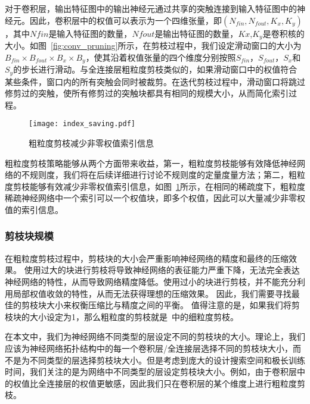 对于卷积层，输出特征图中的输出神经元通过共享的突触连接到输入特征图中的神经元。因此，卷积层中的权值可以表示为一个四维张量，即$(N_{fin},N_{fout},K_x,K_y)$，其中$N {fin}$是输入特征图的数量，$N {fout}$是输出特征图的数量，$K x$,$K_y$是卷积核的大小。如图~\ref{fig:conv_pruning}所示，在剪枝过程中，我们设定滑动窗口的大小为$B_{fin} \times B_{fout} \times B_x \times B_y$，使其沿着权值张量的四个维度分别按照$S_{fin}$，$S_{fout}$，$S_x$和$S_y$的步长进行滑动。与全连接层粗粒度剪枝类似的，如果滑动窗口中的权值符合某些条件，窗口内的所有突触会同时被裁剪。在迭代剪枝过程中，滑动窗口将跳过修剪过的突触，使所有修剪过的突触块都具有相同的规模大小，从而简化索引过程。

\begin{figure}[h]
  \centering
  \texttt{[image: index\_saving.pdf]}
  \caption{粗粒度剪枝减少非零权值索引信息}
  \label{fig:index_saving}
\end{figure}

粗粒度剪枝策略能够从两个方面带来收益，第一，粗粒度剪枝能够有效降低神经网络的不规则度，我们将在后续详细进行讨论不规则度的定量度量方法；第二，粗粒度剪枝能够有效减少非零权值索引信息，如图~\ref{fig:index_saving}所示，在相同的稀疏度下，粗粒度稀疏神经网络中一个索引可以一个权值块，即多个权值，因此可以大量减少非零权值的索引信息。


\subsubsection{剪枝块规模}

在粗粒度剪枝过程中，剪枝块的大小会严重影响神经网络的精度和最终的压缩效果。
使用过大的块进行剪枝将导致神经网络的表征能力严重下降，无法完全表达神经网络的特性，从而导致网络精度降低。使用过小的块进行剪枝，并不能充分利用局部权值收敛的特性，从而无法获得理想的压缩效果。
因此，我们需要寻找最佳的剪枝块大小来权衡压缩比与精度之间的平衡。
值得注意的是，如果我们将剪枝块的大小设定为1，那么粗粒度的剪枝就是~\cite{han2015learning}中的细粒度剪枝。

在本文中，我们为神经网络不同类型的层设定不同的剪枝块的大小。理论上，我们应该为神经网络拓扑结构中的每一个卷积层/全连接层选择不同的剪枝块大小，而不是为不同类型的层选择剪枝块大小。但是考虑到庞大的设计搜索空间和极长训练时间，我们关注的是为网络中不同类型的层设定剪枝块大小。例如，由于卷积层中的权值比全连接层的权值更敏感，因此我们只在卷积层的某个维度上进行粗粒度剪枝。

